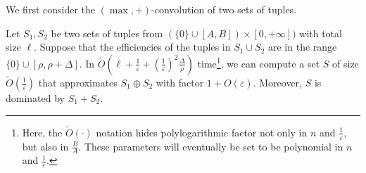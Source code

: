 \documentclass[a4paper,UKenglish,cleveref, autoref, thm-restate, pdfa]{lipics-v2021}
\newcommand{\eps}{\varepsilon}
\begin{document}
We first consider the $(\max, +)$-convolution of two sets of tuples.
\begin{lemma}\label{lem:2d-fft}
    Let $S_1, S_2$ be two sets of tuples from $(\{0\}\cup[A, B]) \times [0, +\infty])$ with total size $\ell$. Suppose that the efficiencies of the tuples in $S_1 \cup S_2$ are in the range $\{0\} \cup [\rho, \rho + \Delta]$. In $\tilde{O}(\ell + \frac{1}{\eps} + (\frac{1}{\eps})^2\frac{\Delta}{\rho})$ time\footnote{Here, the $\tilde{O}(\cdot)$ notation hides polylogarithmic factor not only in $n$ and $\frac{1}{\eps}$, but also in $\frac{B}{A}$. These parameters will eventually be set to be polynomial in $n$ and $\frac{1}{\eps}$.}, we can compute a set $S$ of size $\tilde{O}(\frac{1}{\eps})$ that approximates $S_1 \oplus S_2$ with factor $1 + O(\eps)$. Moreover, $S$ is dominated by $S_1 + S_2$.
\end{lemma}
\end{document}
